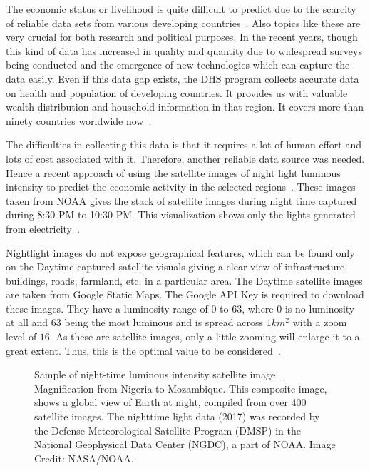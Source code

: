 The economic status or livelihood is quite difficult to predict due to the scarcity of reliable data sets from various developing countries~\cite{jean2016combining}. Also topics like these are very crucial for both research and political purposes. In the recent years, though this kind of data has increased in quality and quantity due to widespread surveys being conducted and the emergence of new technologies which can capture the data easily. Even if this data gap exists, the \ac{DHS} program collects accurate data on health and population of developing countries. It provides us with valuable wealth distribution and household information in that region. It covers more than ninety countries worldwide now~\cite{mullainathan2017machine}.
 
The difficulties in collecting this data is that it requires a lot of human effort and lots of cost associated with it. Therefore, another reliable data source was needed. Hence a recent approach of using the satellite images of night light luminous intensity to predict the economic activity in the selected regions~\cite{pokhriyal2017combining}. These images taken from  \ac{NOAA} gives the stack of satellite images during night time captured during 8:30 PM to 10:30 PM. This visualization shows only the lights generated from electricity~\cite{jin2017method}.

Nightlight images do not expose geographical features, which can be found only on the Daytime captured satellite visuals giving a clear view of infrastructure, buildings, roads, farmland, etc. in a particular area. The Daytime satellite images are taken from Google Static Maps. The Google \ac{API} Key is required to download these images. They have a luminosity range of $0$ to $63$, where $0$ is no luminosity at all and $63$ being the most luminous and is spread across $1 km^2$ with a zoom level of $16$. As these are satellite images, only a little zooming will enlarge it to a great extent. Thus, this is the optimal value to be considered~\cite{chen2006remote}.


\begin{figure}[h!]
\centering
{}
\vspace{-0.2cm}
\caption{\newline Sample of night-time luminous intensity satellite image~\cite{kyba2017artificially}. Magnification from Nigeria to Mozambique.
This composite image, shows a global view of Earth at night, compiled from over 400 satellite images. The nighttime light data (2017) was recorded by the Defense Meteorological Satellite Program (DMSP) in the National Geophysical Data Center (NGDC), a part of NOAA. Image Credit: NASA/NOAA.}
\label{fig:sample_of_night_light}
\end{figure}


